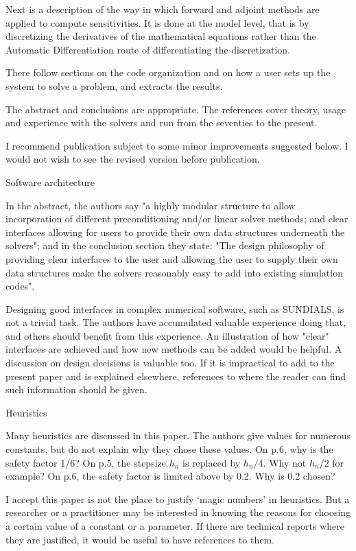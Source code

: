 \documentclass[12pt]{letter}
\begin{document}
Next is a description of the way in which forward and adjoint methods
are applied to compute sensitivities. It is done at the model level,
that is by discretizing the derivatives of the mathematical equations
rather than the Automatic Differentiation route of differentiating the
discretization.

There follow sections on the code organization and on how a user sets
up the system to solve a problem, and extracts the results. 

The abstract and conclusions are appropriate. The references cover
theory, usage and experience with the solvers and run from the
seventies to the present.  

I recommend publication subject to some minor improvements suggested
below.  I would not wish to see the revised version before publication.


Software architecture 

In the abstract, the authors say "a highly modular structure to allow
incorporation of different preconditioning and/or linear solver
methods; and clear interfaces allowing for users to provide their own
data structures underneath the solvers"; and in the conclusion section
they state: "The design philosophy of providing clear interfaces to
the user and allowing the user to supply their own data structures
make the solvers reasonably easy to add into existing simulation
codes".

Designing good interfaces in complex numerical software, such as
SUNDIALS, is not a trivial task. The authors have accumulated valuable
experience doing that, and others should benefit from this
experience. An illustration of how "clear" interfaces are achieved and
how new methods can be added would be helpful.  A discussion on design
decisions is valuable too. If it is impractical to add to the present
paper and is explained elsewhere, references to where the reader can
find such information should be given.


Heuristics 

Many heuristics are discussed in this paper. The authors give values
for numerous constants, but do not explain why they chose these
values.  On p.6, why is the safety factor 1/6? On p.5, the stepsize
$h_n$ is replaced by $h_n/4$. Why not $h_n/2$ for example? On p.6, the
safety factor is limited above by 0.2. Why is 0.2 chosen? 

I accept this paper is not the place to justify `magic numbers' in
heuristics. But a researcher or a practitioner may be interested in
knowing the reasons for choosing a certain value of a constant or a
parameter. If there are technical reports where they are justified, it
would be useful to have references to them. 
\end{document}
